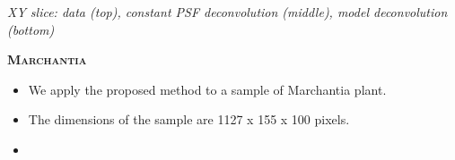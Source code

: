\documentclass[a0paper,portrait,fontscale=0.35]{baposter}
\newcommand{\mycaption}[1]{
  {
    \smaller
    \emph{#1}
  }
}
\theoremstyle{plain}
\theoremstyle{plain}
\theoremstyle{definition}
\theoremstyle{plain}
\theoremstyle{definition}
\begin{document}
\begin{poster}
{\begin{minipage}[t]{0.51\textwidth}
\begin{minipage}[t]{0.49\textwidth}
      \vspace{-1em}
      \begin{center}
        \mycaption{
          XY slice:
          data (top), constant PSF deconvolution (middle),
          model deconvolution (bottom)
        }
      \end{center}
    \end{minipage}
  \end{minipage}
  \begin{minipage}[t]{0.48\textwidth}
    \begin{center}
      \larger
      \textbf{\textsc{Marchantia}}
    \end{center}

    \hspace{-2em}
    \begin{minipage}[t]{0.5\textwidth}

      \begin{itemize}
        \item We apply the proposed method to a sample of 
          Marchantia plant.
        \item The dimensions of the sample 
          are 1127 x 155 x 100 pixels.

        \item
      \end{itemize}
    \end{minipage}
    \begin{minipage}[t]{0.49\textwidth}
      \centering


\end{minipage}
\end{minipage}}
\end{poster}
\end{document}

